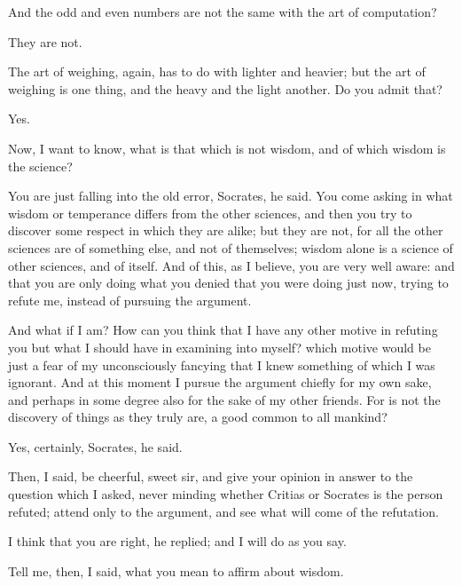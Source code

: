 \documentclass[11pt,letter]{article}
\begin{document}
\par  And the odd and even numbers are not the same with the art of computation?

\par  They are not.

\par  The art of weighing, again, has to do with lighter and heavier; but the art of weighing is one thing, and the heavy and the light another. Do you admit that?

\par  Yes.

\par  Now, I want to know, what is that which is not wisdom, and of which wisdom is the science?

\par  You are just falling into the old error, Socrates, he said. You come asking in what wisdom or temperance differs from the other sciences, and then you try to discover some respect in which they are alike; but they are not, for all the other sciences are of something else, and not of themselves; wisdom alone is a science of other sciences, and of itself. And of this, as I believe, you are very well aware: and that you are only doing what you denied that you were doing just now, trying to refute me, instead of pursuing the argument.

\par  And what if I am? How can you think that I have any other motive in refuting you but what I should have in examining into myself? which motive would be just a fear of my unconsciously fancying that I knew something of which I was ignorant. And at this moment I pursue the argument chiefly for my own sake, and perhaps in some degree also for the sake of my other friends. For is not the discovery of things as they truly are, a good common to all mankind?

\par  Yes, certainly, Socrates, he said.

\par  Then, I said, be cheerful, sweet sir, and give your opinion in answer to the question which I asked, never minding whether Critias or Socrates is the person refuted; attend only to the argument, and see what will come of the refutation.

\par  I think that you are right, he replied; and I will do as you say.

\par  Tell me, then, I said, what you mean to affirm about wisdom.
\end{document}
